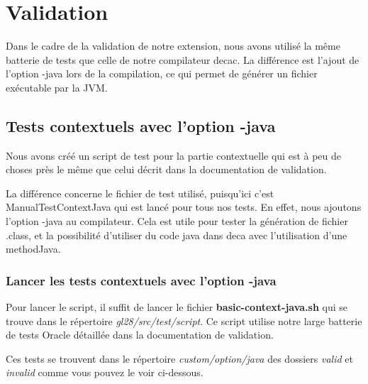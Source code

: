 \documentclass[12pt, a4paper, one side]{article}
\begin{document}
    \newpage
    \section{Validation}
    Dans le cadre de la validation de notre extension, nous avons utilisé la même batterie de tests que celle de notre
    compilateur decac. La différence est l'ajout de l'option -java lors de la compilation, ce qui permet de générer un fichier exécutable par la JVM.

    \subsection{Tests contextuels avec l'option -java}
    Nous avons créé un script de test pour la partie contextuelle qui est à peu de choses près le même que celui décrit dans la documentation de validation.
    \begin{flushleft}
        La différence concerne le fichier de test utilisé, puisqu'ici c'est ManualTestContextJava qui est lancé pour tous nos tests. En effet, nous ajoutons l'option -java au compilateur. Cela est utile pour tester la génération de fichier .class, et la possibilité d'utiliser du code java dans deca avec l'utilisation d'une methodJava.
    \end{flushleft}

    \subsubsection{Lancer les tests contextuels avec l'option -java}
    Pour lancer le script, il suffit de lancer le fichier \textbf{basic-context-java.sh} qui se trouve dans le
    répertoire \textit{gl28/src/test/script}. Ce script utilise notre large batterie de tests Oracle détaillée dans la documentation de validation.
    \begin{flushleft}
        Ces tests se trouvent dans le répertoire \textit{custom/option/java} des dossiers \textit{valid} et \textit{invalid} comme vous pouvez le voir ci-dessous.
    \end{flushleft}
\end{document}
